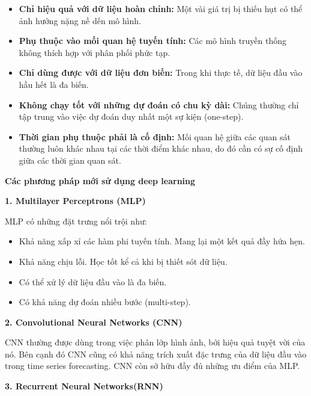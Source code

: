 \begin{itemize}
	\item \textbf{Chỉ hiệu quả với dữ liệu hoàn chỉnh:} Một vài giá trị bị thiếu hụt có thể ảnh hưởng nặng nề dến mô hình.
	\item \textbf{Phụ thuộc vào mối quan hệ tuyến tính:} Các mô hình truyền thống không thích hợp với phân phối phức tạp.
	\item \textbf{Chỉ dùng được với dữ liệu đơn biến:} Trong khi thực tế, dữ liệu đầu vào hầu hết là đa biến.
	\item \textbf{Không chạy tốt với những dự đoán có chu kỳ dài:} Chúng thường chỉ tập trung vào việc dự đoán duy nhất một sự kiện (one-step).
	\item \textbf{Thời gian phụ thuộc phải là cố định:} Mối quan hệ giữa các quan sát thường luôn khác nhau tại các thời điểm khác nhau, do đó cần có sự cố định giữa các thời gian quan sát.
\end{itemize}



\vspace{0.5cm}
\changefontsizes{14pt}
\setlength{\parindent}{0cm}
\textbf{Các phương pháp mới sử dụng deep learning}


\vspace{0.25cm}
\changefontsizes{13pt}
\setlength{\parindent}{0cm}
\textbf{1. Multilayer Perceptrons (MLP)}

\bigskip
MLP có những đặt trưng nổi trội như:

\begin{itemize}
	\item Khả năng xấp xỉ các hàm phi tuyến tính. Mang lại một kết quả đầy hứa hẹn.
	\item Khả năng chịu lỗi. Học tốt kể cả khi bị thiết sót dữ liệu.
	\item Có thể xử lý dữ liệu đầu vào là đa biến.
	\item Có khả năng dự đoán nhiều bước (multi-step).
\end{itemize}



\changefontsizes{13pt}
\setlength{\parindent}{0cm}
\textbf{2. Convolutional Neural Networks (CNN)}

\bigskip
CNN thường được dùng trong việc phân lớp hình ảnh, bởi hiệu quả tuyệt vời của nó. Bên cạnh đó CNN cũng có khả năng trích xuất đặc trưng của dữ liệu đầu vào trong time series forecasting. CNN còn sở hữu đầy đủ những ưu điểm của MLP.


\vspace{0.5cm}
\changefontsizes{13pt}
\setlength{\parindent}{0cm}
\textbf{3. Recurrent Neural Networks(RNN)}

